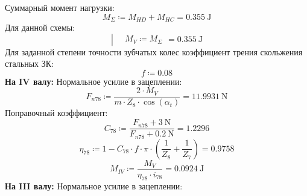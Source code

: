 \documentclass{article}
\newcommand{\defeq}{\coloneq} %
\begin{document}
\colorbox[HTML]{000000}{Суммарный момент нагрузки:}\newline
\begin{equation*}
M_{Σ} \defeq M_{HD}+M_{HC} = {0.355 \: \mathrm{J}}
\end{equation*}
\colorbox[HTML]{000000}{Для данной схемы:}\newline
\begin{equation*}

\left| \begin{aligned}
\,&M_{V} \defeq M_{Σ}\end{aligned} \right. = {0.355 \: \mathrm{J}}
\end{equation*}
\colorbox[HTML]{000000}{Для заданной степени точности зубчатых колес \newline
коэффициент трения скольжения стальных ЗК:}\newline
\begin{equation*}
f \defeq 0.08
\end{equation*}
\colorbox[HTML]{000000}{\textbf{На IV валу:}}\newline
\colorbox[HTML]{000000}{Нормальное усилие в зацеплении:}\newline
\begin{equation*}
\textit{F}_{\textit{n78}} \defeq \frac{2 \cdot M_{V}}{m \cdot \textit{Z}_{\textit{8}} \cdot \cos \left( α_{t} \right)} = {11.9931 \: \mathrm{N}}
\end{equation*}
\colorbox[HTML]{000000}{Поправочный коэффициент:}\newline
\begin{equation*}
\textit{C}_{\textit{78}} \defeq \frac{\textit{F}_{\textit{n78}}+3 \: \mathrm{N}}{\textit{F}_{\textit{n78}}+0.2 \: \mathrm{N}} = {1.2296}
\end{equation*}
\begin{equation*}
\textit{η}_{\textit{78}} \defeq 1-\textit{C}_{\textit{78}} \cdot f \cdot {\pi} \cdot \left( \frac{1}{\textit{Z}_{\textit{8}}}+\frac{1}{\textit{Z}_{\textit{7}}} \right) = {0.9758}
\end{equation*}
\begin{equation*}
M_{IV} \defeq \frac{M_{V}}{\textit{η}_{\textit{78}} \cdot \textit{i}_{\textit{78}}} = {0.0924 \: \mathrm{J}}
\end{equation*}
\colorbox[HTML]{000000}{\textbf{На III валу:}}\newline
\colorbox[HTML]{000000}{Нормальное усилие в зацеплении:}\newline
\end{document}
